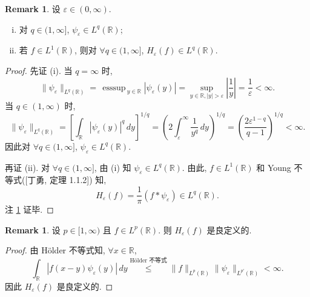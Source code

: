 \documentclass[a4paper,11pt]{article}
\theoremstyle{definition}
\newtheorem{remark}[theorem]{Remark}
\def \esssup {\mathop\mathrm{\,esssup\,}}
\begin{document}
\begin{CJK*}{UTF8}{gbsn}
\begin{remark} \label{remark1}
    设 $ \varepsilon \in (0, \infty) $. 
    \begin{enumerate}[(i)]
      \item 对 $ q \in (1, \infty] $, 
        $ \psi_\varepsilon \in L^q(\mathbb{R}) $;
      \item 若 $ f \in L^1(\mathbb{R}) $, 则对 $ \forall q \in (1, \infty] $, 
        $ H_\varepsilon (f) \in L^q(\mathbb{R}) $.
    \end{enumerate}
\end{remark} 

\begin{proof}
    先证 (i). 当 $ q = \infty $ 时,
    $$
        \| \psi_\varepsilon \|_{L^q(\mathbb{R})}
            = \esssup_{y \in \mathbb{R}} | \psi_\varepsilon(y) |
            = \sup_{y \in \mathbb{R}, |y| > \varepsilon} \left| \frac{1}{y} \right|
            = \frac{1}{\varepsilon} < \infty.
    $$
    当 $ q \in (1, \infty) $ 时,
    $$
        \| \psi_\varepsilon \|_{L^q(\mathbb{R})}
            = \left[ \int_\mathbb{R} |\psi_\varepsilon(y)|^q \, dy \right]^{1/q}
            = \left( 2 \int_\varepsilon^\infty \frac{1}{y^q} \, dy \right)^{1/q}  
            = \left( \frac{2 \varepsilon^{1 - q}}{q - 1} \right)^{1/q}  
            < \infty.
    $$
    因此对 $ \forall q \in (1, \infty] $, $ \psi_\varepsilon \in L^q(\mathbb{R}) $.
    
    再证 (ii). 对 $ \forall q \in (1, \infty] $, 
    由 (i) 知 $ \psi_\varepsilon \in L^q(\mathbb{R}) $.
    由此, $ f \in L^1(\mathbb{R}) $ 和 Young 不等式([丁勇, 定理 1.1.2]) 知,
    $$
        H_\varepsilon (f)
            = \frac{1}{\pi} (f * \psi_\varepsilon)
            \in L^q(\mathbb{R}).
    $$
    注 \ref{remark1} 证毕.
\end{proof}
  
\begin{remark} 
    设 $ p \in [1, \infty) $ 且 $ f \in L^p(\mathbb{R}) $. 则 $ H_\varepsilon (f) $ 是良定义的.
\end{remark}

\begin{proof}
    由 H\"older 不等式知, $ \forall x \in \mathbb{R} $,
    $$
        \int_\mathbb{R} | f(x - y) \psi_\varepsilon(y) | \, dy
            \overset{\text{H\"older 不等式}}{\leq} 
            \| f \|_{L^p(\mathbb{R})} \| \psi_\varepsilon \|_{L^{p'}(\mathbb{R})} < \infty.
    $$
    因此 $ H_\varepsilon (f) $ 是良定义的.
\end{proof}



\end{CJK*}
\end{document}
